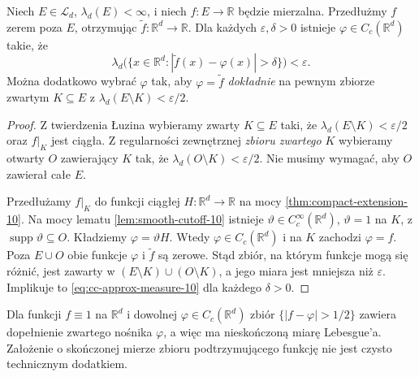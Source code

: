 \begin{twierdzenie}
\label{thm:cc-approx-in-measure-10}
Niech $E\in\mathcal L_d$, $\lambda_d(E)<\infty$,
i niech $f:E\to\mathbb R$ będzie mierzalna.
Przedłużmy $f$ zerem poza $E$, otrzymując
$\widetilde f:\mathbb R^d\to\mathbb R$.
Dla każdych $\varepsilon,\delta>0$ istnieje
$\varphi\in C_c(\mathbb R^d)$ takie, że
\begin{equation}\label{eq:cc-approx-measure-10}
\lambda_d\bigl(\{x\in\mathbb R^d:
|\widetilde f(x)-\varphi(x)|>\delta\}\bigr)
<\varepsilon.
\end{equation}
Można dodatkowo wybrać $\varphi$ tak, aby
$\varphi=\widetilde f$ \emph{dokładnie} na pewnym
zbiorze zwartym $K\subseteq E$ z
$\lambda_d(E\setminus K)<\varepsilon/2$.
\end{twierdzenie}
\begin{proof}
Z twierdzenia Łuzina wybieramy zwarty
$K\subseteq E$ taki, że
$\lambda_d(E\setminus K)<\varepsilon/2$
oraz $f|_K$ jest ciągła.
Z regularności zewnętrznej \emph{zbioru zwartego}
$K$ wybieramy otwarty $O$ zawierający $K$ tak,
że $\lambda_d(O\setminus K)<\varepsilon/2$.
Nie musimy wymagać, aby $O$ zawierał całe $E$.

Przedłużamy $f|_K$ do funkcji ciągłej
$H:\mathbb R^d\to\mathbb R$ na mocy
\ref{thm:compact-extension-10}. Na mocy lematu
\ref{lem:smooth-cutoff-10} istnieje
$\vartheta\in C_c^\infty(\mathbb R^d)$, $\vartheta=1$ na $K$,
z $\operatorname{supp}\vartheta\subseteq O$.
Kładziemy $\varphi=\vartheta H$. Wtedy
$\varphi\in C_c(\mathbb R^d)$ i na $K$ zachodzi
$\varphi=f$. Poza $E\cup O$ obie funkcje
$\varphi$ i $\widetilde f$ są zerowe. Stąd
zbiór, na którym funkcje mogą się różnić,
jest zawarty w $(E\setminus K)\cup(O\setminus K)$,
a jego miara jest mniejsza niż $\varepsilon$.
Implikuje to \eqref{eq:cc-approx-measure-10}
dla każdego $\delta>0$.
\end{proof}

\begin{uwaga}
Dla funkcji $f\equiv1$ na $\mathbb R^d$ i dowolnej
$\varphi\in C_c(\mathbb R^d)$ zbiór
$\{|f-\varphi|>1/2\}$ zawiera dopełnienie
zwartego nośnika $\varphi$, a więc ma nieskończoną
miarę Lebesgue'a. Założenie o skończonej mierze
zbioru podtrzymującego funkcję nie jest czysto
technicznym dodatkiem.
\end{uwaga}

